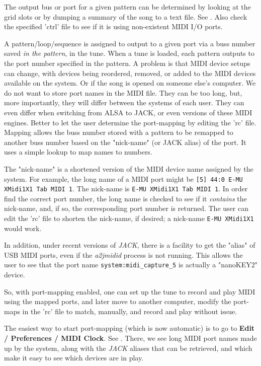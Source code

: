    The output bus or port for a given pattern can be determined by
   looking at the grid slots or by dumping a summary of the song to
   a text file.
   See .
   Also check the specified 'ctrl' file to see if it is using
   non-existent MIDI I/O ports.

   A pattern/loop/sequence is assigned to output to a given port via
   a buss number saved \textsl{in the pattern}, in the tune.
   When a tune is loaded,
   each pattern outputs to the port number specified in the pattern.
   A problem is that MIDI device setups can change, with devices being
   reordered, removed, or added to the MIDI devices available on the system.
   Or if the song is opened on someone else's computer.
   We do not want to store port names in the MIDI file.
   They can be too long, but, more importantly,
   they will differ between the systems of each user.
   They can even differ when switching from ALSA to JACK, or even versions
   of these MIDI engines.
   Better to let the user determine the port-mapping by editing
   the 'rc' file.
   Mapping allows the buss number stored with a pattern to be
   remapped to another buss number based on the "nick-name"
   (or JACK alias) of the port.
   It uses a simple lookup to map names to numbers.

   The "nick-name" is a shortened version of the MIDI device name assigned
   by the system.
   For example, the long name of a MIDI port might be
   \texttt{[5] 44:0 E-MU XMidi1X1 Tab MIDI 1}.
   The nick-name is \texttt{E-MU XMidi1X1 Tab MIDI 1}.
   In order find the correct port number, the long name is checked to see if it
   \textsl{contains} the nick-name, and, if so, the corresponding port number is
   returned.  The user can edit the 'rc' file to shorten the nick-name, if
   desired; a nick-name \texttt{E-MU XMidi1X1} would work.

   In addition, under recent versions of \textsl{JACK},
   there is a facility to get the "alias" of USB MIDI ports,
   even if the \textsl{a2jmidid} process is not running.
   This allows the user to see that the port name
   \texttt{system:midi\_capture\_5} is actually a "nanoKEY2" device.

   So, with port-mapping enabled, one can set up the tune to record and play
   MIDI using the mapped ports, and later move to another computer, modify the
   port-maps in the 'rc' file to match, manually,
   and record and play without issue.

   The easiest way to start port-mapping (which is now automatic) is to go to
   \textbf{Edit / Preferences / MIDI Clock}.
   See .
   There, we see long MIDI port names made up by the system, along
   with the \textsl{JACK} aliases that can be retrieved, and which make it easy
   to see which devices are in play.

